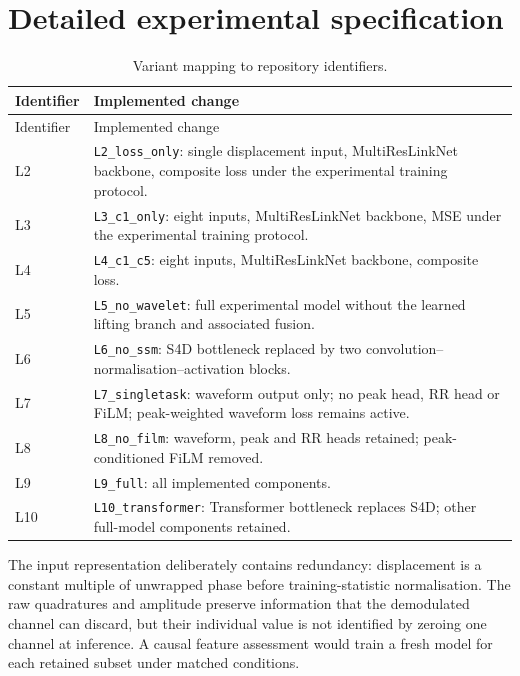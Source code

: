\documentclass[11pt,a4paper]{article}
\begin{document}
\FloatBarrier



\clearpage
\appendix
\section{Detailed experimental specification}
\label{app:spec}

\begin{longtable}{>{\raggedright\arraybackslash}p{.18\linewidth}>{\raggedright\arraybackslash}p{.72\linewidth}}
\caption{Variant mapping to repository identifiers.}\label{tab:variants}\\
\toprule Identifier & Implemented change\\\midrule\endfirsthead
\toprule Identifier & Implemented change\\\midrule\endhead
L2 & \texttt{L2\_loss\_only}: single displacement input, MultiResLinkNet backbone, composite loss under the experimental training protocol.\\
L3 & \texttt{L3\_c1\_only}: eight inputs, MultiResLinkNet backbone, MSE under the experimental training protocol.\\
L4 & \texttt{L4\_c1\_c5}: eight inputs, MultiResLinkNet backbone, composite loss.\\
L5 & \texttt{L5\_no\_wavelet}: full experimental model without the learned lifting branch and associated fusion.\\
L6 & \texttt{L6\_no\_ssm}: S4D bottleneck replaced by two convolution--normalisation--activation blocks.\\
L7 & \texttt{L7\_singletask}: waveform output only; no peak head, RR head or FiLM; peak-weighted waveform loss remains active.\\
L8 & \texttt{L8\_no\_film}: waveform, peak and RR heads retained; peak-conditioned FiLM removed.\\
L9 & \texttt{L9\_full}: all implemented components.\\
L10 & \texttt{L10\_transformer}: Transformer bottleneck replaces S4D; other full-model components retained.\\\bottomrule
\end{longtable}

The input representation deliberately contains redundancy: displacement is a constant
multiple of unwrapped phase before training-statistic normalisation. The raw quadratures
and amplitude preserve information that the demodulated channel can discard, but their
individual value is not identified by zeroing one channel at inference. A causal feature
assessment would train a fresh model for each retained subset under matched conditions.
\end{document}
